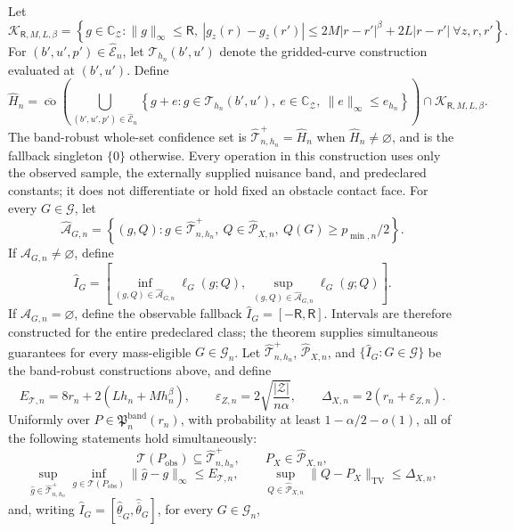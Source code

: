 Let
\[
\mathcal K_{\mathsf R,M,L,\beta}
=\left\{g\in\mathbb C_{\mathcal Z}:\|g\|_\infty\leq\mathsf R,
\ |g_z(r)-g_z(r')|
\leq2M|r-r'|^\beta+2L|r-r'|\ \forall z,r,r'\right\}.
\]
For \((b',u',p')\in\widehat{\mathcal E}_n\), let \(\mathcal T_{h_n}(b',u')\) denote the gridded-curve construction evaluated at \((b',u')\).  Define
\[
\widehat H_n=
\overline{\operatorname{co}}\!\left(
\bigcup_{(b',u',p')\in\widehat{\mathcal E}_n}
\left\{g+e:g\in\mathcal T_{h_n}(b',u'),\ e\in\mathbb C_{\mathcal Z},\
\|e\|_\infty\leq e_{h_n}\right\}\right)
\cap\mathcal K_{\mathsf R,M,L,\beta}.
\]
The band-robust whole-set confidence set is \(\widehat{\mathcal T}_{n,h_n}^{+}=\widehat H_n\) when \(\widehat H_n\neq\varnothing\), and is the fallback singleton \(\{0\}\) otherwise.  Every operation in this construction uses only the observed sample, the externally supplied nuisance band, and predeclared constants; it does not differentiate or hold fixed an obstacle contact face.
For every \(G\in\mathcal G\), let
\[
\widehat{\mathcal A}_{G,n}
=\left\{(g,Q):g\in\widehat{\mathcal T}_{n,h_n}^{+},\
Q\in\widehat{\mathcal P}_{X,n},\ Q(G)\geq p_{\min,n}/2\right\}.
\]
If \(\widehat{\mathcal A}_{G,n}\neq\varnothing\), define
\[
\widehat I_G=
\left[
\inf_{(g,Q)\in\widehat{\mathcal A}_{G,n}}\ell_G(g;Q),
\ \sup_{(g,Q)\in\widehat{\mathcal A}_{G,n}}\ell_G(g;Q)
\right].
\]
If \(\widehat{\mathcal A}_{G,n}=\varnothing\), define the observable fallback \(\widehat I_G=[-\mathsf R,\mathsf R]\).  Intervals are therefore constructed for the entire predeclared class; the theorem supplies simultaneous guarantees for every mass-eligible \(G\in\mathcal G_n\).
Let \(\widehat{\mathcal T}_{n,h_n}^{+}\), \(\widehat{\mathcal P}_{X,n}\), and \(\{\widehat I_G:G\in\mathcal G\}\) be the band-robust constructions above, and define
\[
E_{\mathcal T,n}=8r_n+2(Lh_n+Mh_n^\beta),
\qquad
\varepsilon_{Z,n}=2\sqrt{\frac{|\mathcal Z|}{n\alpha}},
\qquad
\Delta_{X,n}=2(r_n+\varepsilon_{Z,n}).
\]
Uniformly over \(P\in\mathfrak P_n^{\mathrm{band}}(r_n)\), with probability at least \(1-\alpha/2-o(1)\), all of the following statements hold simultaneously:
\[
\mathcal T(P_{\mathrm{obs}})\subseteq\widehat{\mathcal T}_{n,h_n}^{+},
\qquad
P_X\in\widehat{\mathcal P}_{X,n},
\]
\[
\sup_{\widehat g\in\widehat{\mathcal T}_{n,h_n}^{+}}
\inf_{g\in\mathcal T(P_{\mathrm{obs}})}\|\widehat g-g\|_\infty
\leq E_{\mathcal T,n},
\qquad
\sup_{Q\in\widehat{\mathcal P}_{X,n}}\|Q-P_X\|_{\mathrm{TV}}
\leq\Delta_{X,n},
\]
and, writing \(\widehat I_G=[\widehat{\underline\theta}_G,\widehat{\overline\theta}_G]\), for every \(G\in\mathcal G_n\),
